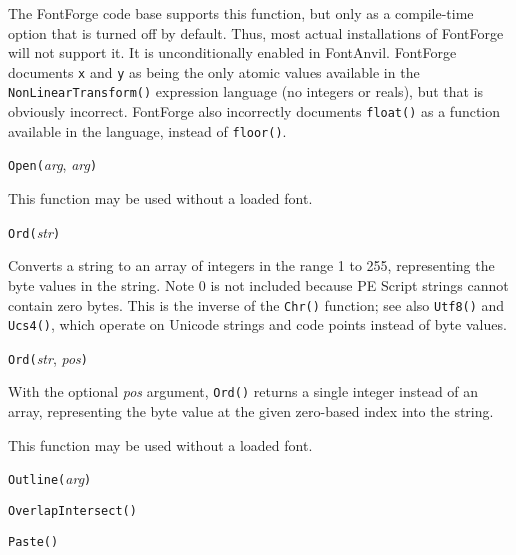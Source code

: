 The FontForge \FFdiff code base supports this function, but only as a
compile-time option that is turned off by default.  Thus, most actual
installations of FontForge will not support it.  It is unconditionally
enabled in FontAnvil.  FontForge documents \texttt{x} and \texttt{y} as
being the only atomic values available in the \texttt{NonLinearTransform()}
expression language (no integers or reals), but that is obviously
incorrect.  FontForge also incorrectly documents \texttt{float()} as a
function available in the language, instead of \texttt{floor()}.



\texttt{Open(}\textit{arg}, \textit{arg}\texttt{)}

This function may be used without a loaded font.



\texttt{Ord(}\textit{str}\texttt{)}

Converts a string to an array of integers in the range 1 to 255,
representing the byte values in the string.  Note 0 is not included
because PE Script strings cannot contain zero bytes.
This is the inverse of the \texttt{Chr()}
function; see also \texttt{Utf8()} and \texttt{Ucs4()}, which operate on
Unicode strings and code points instead of byte values.

\texttt{Ord(}\textit{str}, \textit{pos}\texttt{)}

With the optional \textit{pos} argument, \texttt{Ord()} returns a single
integer instead of an array, representing the byte value at the given
zero-based index into the string.

This function may be used without a loaded font.



\texttt{Outline(}\textit{arg}\texttt{)}



\texttt{OverlapIntersect(}\texttt{)}



\texttt{Paste(}\texttt{)}


